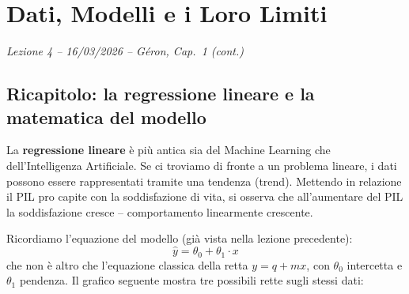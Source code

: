 \chapter{Dati, Modelli e i Loro Limiti}
\begin{flushright}\small\textit{Lezione 4 -- 16/03/2026 -- G\'eron, Cap.\ 1 (cont.)}\end{flushright}

\section{Ricapitolo: la regressione lineare e la matematica del modello}

La \textbf{regressione lineare} è più antica sia del Machine Learning che dell'Intelligenza Artificiale. Se ci troviamo di fronte a un problema lineare, i dati possono essere rappresentati tramite una tendenza (trend). Mettendo in relazione il PIL pro capite con la soddisfazione di vita, si osserva che all'aumentare del PIL la soddisfazione cresce -- comportamento linearmente crescente.

Ricordiamo l'equazione del modello (già vista nella lezione precedente):
\[
\hat{y} = \theta_0 + \theta_1 \cdot x
\]
che non è altro che l'equazione classica della retta $y = q + mx$, con $\theta_0$ intercetta e $\theta_1$ pendenza. Il grafico seguente mostra tre possibili rette sugli stessi dati:

\begin{center}
\end{center}

